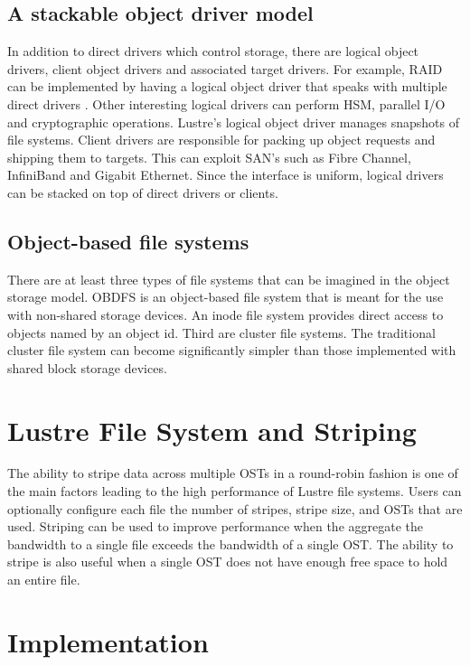 \documentclass[9pt,twocolumn,twoside]{../../styles/osajnl}
\begin{document}
\subsection{A stackable object driver model}
In addition to direct drivers which control storage, there are logical
object drivers, client object drivers and associated target
drivers. For example, RAID can be implemented by having a logical
object driver that speaks with multiple direct drivers
\cite{www-whatislustre}. Other interesting logical drivers can perform
HSM, parallel I/O and cryptographic operations. Lustre’s logical
object driver manages snapshots of file systems. Client drivers are
responsible for packing up object requests and shipping them to
targets. This can exploit SAN's such as Fibre Channel, InfiniBand and
Gigabit Ethernet. Since the interface is uniform, logical drivers can
be stacked on top of direct drivers or clients.

\subsection{Object-based file systems}
There are at least three types of file systems that can be imagined in
the object storage model. OBDFS is an object-based file system that is
meant for the use with non-shared storage devices. An inode file
system provides direct access to objects named by an object id. Third
are cluster file systems. The traditional cluster file system can
become significantly simpler than those implemented with shared block
storage devices.

\section{Lustre File System and Striping}
The ability to stripe data across multiple OSTs in a round-robin
fashion is one of the main factors leading to the high performance of
Lustre file systems. Users can optionally configure each file the
number of stripes, stripe size, and OSTs that are used. Striping can
be used to improve performance when the aggregate the bandwidth to a
single file exceeds the bandwidth of a single OST. The ability to
stripe is also useful when a single OST does not have enough free
space to hold an entire file.

\section{Implementation}
\end{document}
